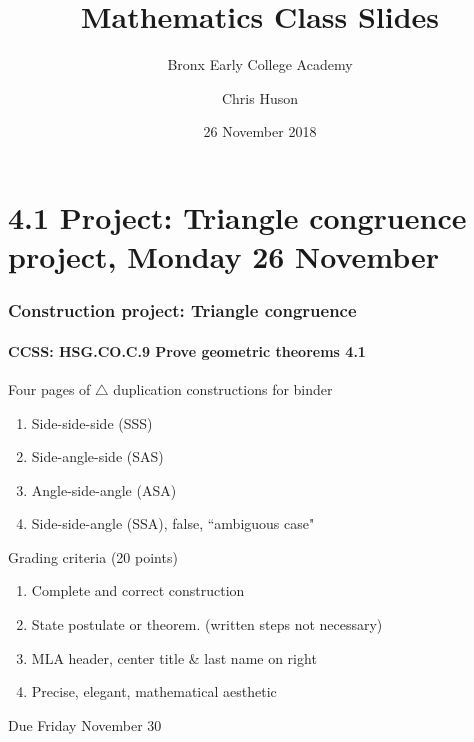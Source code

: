 \documentclass{beamer}
\title{Mathematics Class Slides}
\subtitle{Bronx Early College Academy}
\author{Chris Huson}
\date{26 November 2018}
\begin{document}
\frame{\titlepage}
\section[Outline]{}
\frame{\tableofcontents}


\section{4.1 Project: Triangle congruence project, Monday 26 November}
  \frame
  {
    \frametitle{Construction project: Triangle congruence}
    \framesubtitle{CCSS: HSG.CO.C.9 Prove geometric theorems  \alert{4.1}}

    \begin{block}{Four pages of $\triangle$ duplication constructions for binder}
    \begin{enumerate}
        \item Side-side-side (SSS)
        \item Side-angle-side (SAS)
        \item Angle-side-angle (ASA)
        \item Side-side-angle (SSA), false, ``ambiguous case"
    \end{enumerate}
        Grading criteria (20 points)
    \begin{enumerate}
        \item Complete and correct construction
        \item State postulate or theorem. (written steps not necessary)
        \item MLA header, center title \& last name on right
        \item Precise, elegant, mathematical aesthetic
    \end{enumerate}
    \end{block}
    Due Friday November 30
    }
\end{document}
